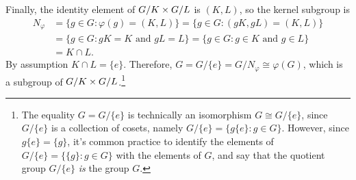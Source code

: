 \documentclass[12pt,reqno]{amsart}
\newcommand{\<}{\ensuremath{\langle}}
\renewcommand{\>}{\ensuremath{\rangle}}
\begin{document}
\begin{enumerate}
Finally, the identity element of $G/K \times G/L$ is $(K,L)$, so the kernel
subgroup is 
\begin{align*}
  N_\varphi &= \{g \in G : \varphi(g) = (K,L)\}= \{g \in G : (gK,gL) = (K,L)\}\\
&= \{g \in G : gK = K \text{ and } gL=L\}= \{g \in G : g\in K \text{ and } g\in L\}\\
&= K\cap L.
\end{align*}
By assumption $K\cap L= \{e\}$. Therefore, 
$G = G/\{e\} = G/N_\varphi \cong \varphi(G)$, which is a subgroup of $G/K \times G/L$.\footnote{The equality 
$G = G/\{e\}$ is technically an isomorphism $G \cong G/\{e\}$, 
  since $G/\{e\}$ is a collection of cosets, namely 
  $G/\{e\} = \{g\{e\} : g\in G\}$. However, since $g\{e\} = \{g\}$, it's
  common practice to identify the elements of $G/\{e\} = \{\{g\} : g\in G\}$ with the
  elements of $G$, and say that the quotient group $G/\{e\}$ \emph{is} the group
  $G$.}

   


\end{enumerate}
\end{document}
